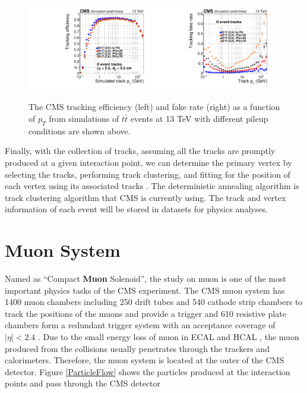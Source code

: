 \begin{figure}[hbtp]
\begin{center}
\includegraphics[width=0.48\textwidth]{Figures/Chapter2/TrackPTEff.pdf}
\includegraphics[width=0.48\textwidth]{Figures/Chapter2/TrackPTFake.pdf}
\caption{The CMS tracking efficiency (left) and fake rate (right) as a function of $p_T$ from simulations of $t \bar t$ events at 13 TeV with different pileup conditions are shown above.}
\label{CMSTrackPer}
\end{center}
\end{figure} 

Finally, with the collection of tracks, assuming all the tracks are promptly produced at a given interaction point, we can determine the primary vertex by selecting the tracks, performing track clustering, and fitting for the position of each vertex using its associated tracks \cite{CMSTrackComp}. The deterministic annealing algorithm \cite{DAAlgo} is track clustering algorithm that CMS is currently using. The track and vertex information of each event will be stored in datasets for physics analyses.

\fi

\section{Muon System}

Named as ``Compact \textbf{Muon} Solenoid'', the study on muon is one of the most important physics tasks of the CMS experiment. The CMS muon system has 1400 muon chambers including 250 drift tubes and 540 cathode strip chambers to track the positions of the muons and provide a trigger and 610 resistive plate chambers form a redundant trigger system with an acceptance coverage of $|\eta| < 2.4$ . Due to the small energy loss of muon in ECAL and HCAL \cite{AlphaTheoEx}, the muon produced from the collisions usually penetrates through the trackers and calorimeters. Therefore, the muon system is located at the outer of the CMS detector. Figure \ref{ParticleFlow} shows the particles produced at the interaction points and pass through the CMS detector

